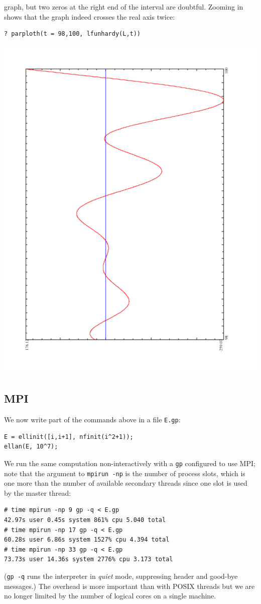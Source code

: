 \documentclass{deliverablereport}
\begin{document}
graph, but two zeros at the right end of the interval are doubtful. Zooming
in shows that the graph indeed crosses the real axis twice:
\begin{verbatim}
? parploth(t = 98,100, lfunhardy(L,t))
\end{verbatim}
\begin{center}
\includegraphics[scale=0.45,angle=-90]{L2.pdf}
\end{center}

\subsection{MPI}

We now write part of the commands above in a file \texttt{E.gp}:
\begin{verbatim}
E = ellinit([i,i+1], nfinit(i^2+1));
ellan(E, 10^7);
\end{verbatim}
We run the same computation non-interactively with a \texttt{gp} configured
to use MPI; note that the argument to \texttt{mpirun -np} is the number of
process slots, which is one more than the number of available secondary
threads since one slot is used by the master thread:
\begin{verbatim}
# time mpirun -np 9 gp -q < E.gp
42.97s user 0.45s system 861% cpu 5.040 total
# time mpirun -np 17 gp -q < E.gp
60.28s user 6.86s system 1527% cpu 4.394 total
# time mpirun -np 33 gp -q < E.gp
73.73s user 14.36s system 2776% cpu 3.173 total
\end{verbatim}
(\texttt{gp -q} runs the interpreter in \emph{quiet} mode, suppressing header
and good-bye messages.) The overhead is more important than with POSIX
threads but we are no longer limited by the number of logical cores on a
single machine.
\end{document}
